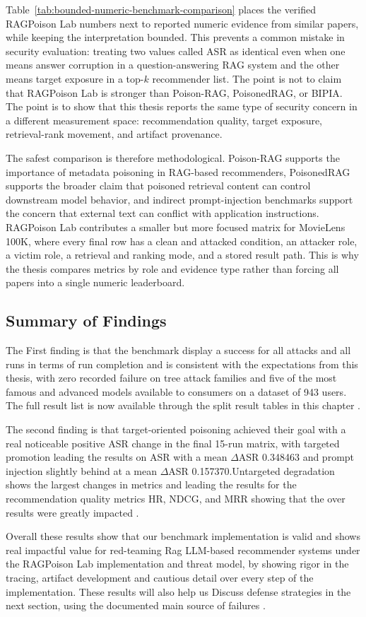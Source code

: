 

Table~\ref{tab:bounded-numeric-benchmark-comparison} places the verified RAGPoison Lab numbers next to reported numeric evidence from similar papers, while keeping the interpretation bounded. This prevents a common mistake in security evaluation: treating two values called ASR as identical even when one means answer corruption in a question-answering RAG system and the other means target exposure in a top-$k$ recommender list. The point is not to claim that RAGPoison Lab is stronger than Poison-RAG, PoisonedRAG, or BIPIA. The point is to show that this thesis reports the same type of security concern in a different measurement space: recommendation quality, target exposure, retrieval-rank movement, and artifact provenance.

The safest comparison is therefore methodological. Poison-RAG supports the importance of metadata poisoning in RAG-based recommenders, PoisonedRAG supports the broader claim that poisoned retrieval content can control downstream model behavior, and indirect prompt-injection benchmarks support the concern that external text can conflict with application instructions. RAGPoison Lab contributes a smaller but more focused matrix for MovieLens 100K, where every final row has a clean and attacked condition, an attacker role, a victim role, a retrieval and ranking mode, and a stored result path. This is why the thesis compares metrics by role and evidence type rather than forcing all papers into a single numeric leaderboard.

\subsection{Summary of Findings}

The First finding is that the benchmark display a success for all attacks and all runs in terms of run completion and is consistent with the expectations from this thesis, with zero recorded failure on tree attack families and five of the most famous and advanced models available to consumers on a dataset of 943 users. The full result list is now available through the split result tables in this chapter \cite{ragpoisonlab_repo}.

The second finding is that target-oriented poisoning achieved their goal with a real noticeable positive ASR change in the final 15-run matrix, with targeted promotion leading the results on ASR with a mean \(\Delta\)ASR 0.348463 and prompt injection slightly behind at  a mean \(\Delta\)ASR 0.157370.Untargeted degradation shows the largest changes in metrics and leading the results for the recommendation quality metrics HR, NDCG, and MRR showing that the over results were greatly impacted \cite{ragpoisonlab_repo}. 

Overall these results show that our benchmark implementation is valid and shows real impactful value for red-teaming Rag LLM-based recommender systems under the RAGPoison Lab implementation and threat model, by showing rigor in the tracing, artifact development and cautious detail over every step of the implementation. These results will also help us Discuss defense strategies in the next section, using the documented main source of failures \cite{ragpoisonlab_repo}.